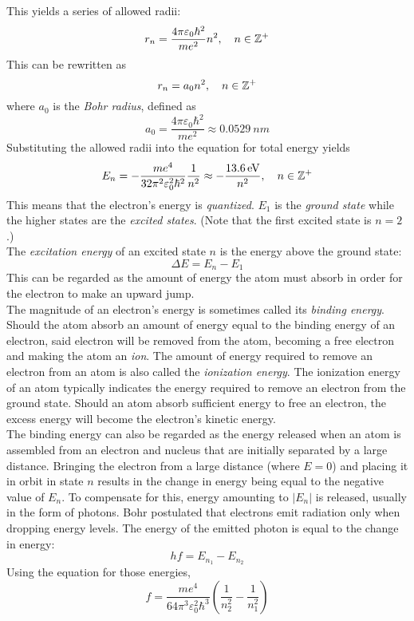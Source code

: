 \documentclass{subfiles}
\begin{document}
			This yields a series of allowed radii:
			\[
				r_n = \frac{4\pi\varepsilon_0\hbar^2}{me^2}n^2
					, \quad n \in \mathbb{Z}^+
			\]
			This can be rewritten as
			\[
				r_n = a_0n^2
					, \quad n \in \mathbb{Z}^+
			\]
			where \(a_0\) is the \textit{Bohr radius}, defined as
			\[
				a_0 = \frac{4\pi\varepsilon_0\hbar^2}{me^2}
					\approx \SI{0.0529}{nm}
					\tag{Bohr radius}
			\]
			Substituting the allowed radii into the equation for total energy yields
			\[
				E_n = -\frac{me^4}{32\pi^2\varepsilon_0^2\hbar^2}\frac{1}{n^2}
					\approx -\frac{\SI{13.6}{eV}}{n^2}
					, \quad n \in \mathbb{Z}^+
			\]
			This means that the electron's energy is \textit{quantized}. \(E_1\) is the \textit{ground state} while the higher states are the \textit{excited states}. (Note that the first excited state is \(n = 2\).) \\
			The \textit{excitation energy} of an excited state \(n\) is the energy above the ground state:
			\[
				\Delta E = E_n - E_1
					\tag{excitation energy}
			\]
			This can be regarded as the amount of energy the atom must absorb in order for the electron to make an upward jump. \\
			The magnitude of an electron's energy is sometimes called its \textit{binding energy}. Should the atom absorb an amount of energy equal to the binding energy of an electron, said electron will be removed from the atom, becoming a free electron and making the atom an \textit{ion}. The amount of energy required to remove an electron from an atom is also called the \textit{ionization energy}. The ionization energy of an atom typically indicates the energy required to remove an electron from the ground state. Should an atom absorb sufficient energy to free an electron, the excess energy will become the electron's kinetic energy. \\
			The binding energy can also be regarded as the energy released when an atom is assembled from an electron and nucleus that are initially separated by a large distance. Bringing the electron from a large distance (where \(E = 0\)) and placing it in orbit in state \(n\) results in the change in energy being equal to the negative value of \(E_n\). To compensate for this, energy amounting to \(|E_n|\) is released, usually in the form of photons.
			Bohr postulated that electrons emit radiation only when dropping energy levels. The energy of the emitted photon is equal to the change in energy:
				\[hf = E_{n_1} - E_{n_2}\]
				Using the equation for those energies,
				\[f = \frac{me^4}{64\pi^3\varepsilon_0^2\hbar^3}\left(\frac{1}{n_2^2} - \frac{1}{n_1^2}\right)\]
\end{document}
